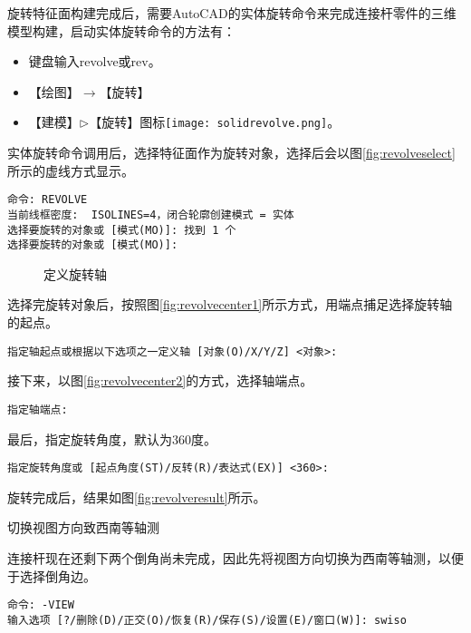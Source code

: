 \begin{procedure}
旋转特征面构建完成后，需要AutoCAD的实体旋转命令来完成连接杆零件的三维模型构建，启动实体旋转命令的方法有：
\begin{itemize}
\item 键盘输入revolve或rev。
\item 【绘图】$\rightarrow$【旋转】
\item 【建模】$\triangleright$【旋转】图标\texttt{[image: solidrevolve.png]}。
\end{itemize}

实体旋转命令调用后，选择特征面作为旋转对象，选择后会以图\ref{fig:revolveselect}所示的虚线方式显示。
\begin{lstlisting}
命令: REVOLVE
当前线框密度:  ISOLINES=4，闭合轮廓创建模式 = 实体
选择要旋转的对象或 [模式(MO)]: 找到 1 个
选择要旋转的对象或 [模式(MO)]:
\end{lstlisting}

\begin{figure}[htbp]
\centering
{}\hspace{20pt}
\caption{定义旋转轴}
\end{figure}

选择完旋转对象后，按照图\ref{fig:revolvecenter1}所示方式，用端点捕足选择旋转轴的起点。
\begin{lstlisting}
指定轴起点或根据以下选项之一定义轴 [对象(O)/X/Y/Z] <对象>:
\end{lstlisting}

接下来，以图\ref{fig:revolvecenter2}的方式，选择轴端点。
\begin{lstlisting}
指定轴端点:
\end{lstlisting}

最后，指定旋转角度，默认为360度。
\begin{lstlisting}
指定旋转角度或 [起点角度(ST)/反转(R)/表达式(EX)] <360>:
\end{lstlisting}

旋转完成后，结果如图\ref{fig:revolveresult}所示。
\item 切换视图方向致西南等轴测

连接杆现在还剩下两个倒角尚未完成，因此先将视图方向切换为西南等轴测，以便于选择倒角边。
\begin{lstlisting}
命令: -VIEW
输入选项 [?/删除(D)/正交(O)/恢复(R)/保存(S)/设置(E)/窗口(W)]: swiso 
\end{lstlisting}


\end{procedure}
